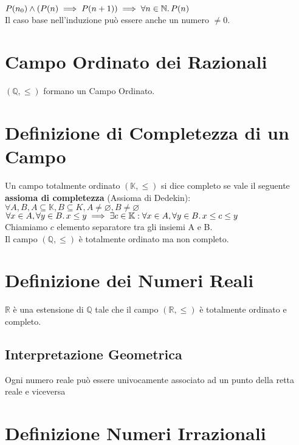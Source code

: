 \documentclass[a4paper, twoside, italian, 11pt]{book}
\newcommand{\N}{\mathbb{N}}
\newcommand{\Q}{\mathbb{Q}}
\newcommand{\K}{\mathbb{K}}
\newcommand{\R}{\mathbb{R}}
\let\emptyset\varnothing
\begin{document}
\indent
$P(n_0) \land (P(n) \implies P(n + 1)) \implies \forall n \in \N \ldotp P(n)$ \\

\noindent
Il caso base nell'induzione può essere anche un numero $\neq 0$.



\section{Campo Ordinato dei Razionali}
\noindent
$(\Q, \leq)$ formano un Campo Ordinato.


\section{Definizione di Completezza di un Campo}

\noindent
Un campo totalmente ordinato $(\K, \leq)$ si dice completo se vale il seguente \textbf{assioma di completezza} (Assioma di Dedekin): \\

$\forall A, B, A \subseteq \K, B \subseteq K, A \neq \emptyset, B \neq \emptyset$ \\

$\forall x \in A, \forall y \in B \ldotp x \leq y \implies \exists c \in \K : \forall x \in A, \forall y \in B \ldotp x \leq c \leq y$ \\

\noindent
Chiamiamo $c$ elemento separatore tra gli insiemi A e B. \\

\noindent
Il campo $(\Q, \leq)$ è totalmente ordinato ma non completo.


\section{Definizione dei Numeri Reali}

\noindent
$\R$ è una estensione di $\Q$ tale che il campo $(\R, \leq)$ è totalmente ordinato e completo.


\subsection{Interpretazione Geometrica}

\noindent
Ogni numero reale può essere univocamente associato ad un punto della retta reale e viceversa



\section{Definizione Numeri Irrazionali}
\end{document}
